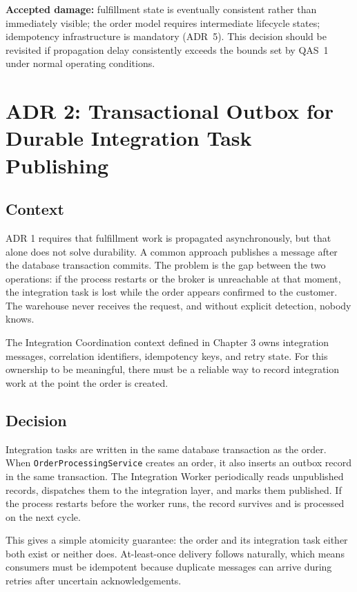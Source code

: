\textbf{Accepted damage:} fulfillment state is eventually consistent rather than immediately
visible; the order model requires intermediate lifecycle states; idempotency infrastructure
is mandatory (ADR~5). This decision should be revisited if propagation delay consistently
exceeds the bounds set by QAS~1 under normal operating conditions.

\section{ADR 2: Transactional Outbox for Durable Integration Task Publishing}

\subsection{Context}

ADR 1 requires that fulfillment work is propagated asynchronously, but that alone does not
solve durability. A common approach publishes a message after the database transaction commits.
The problem is the gap between the two operations: if the process restarts or the broker is
unreachable at that moment, the integration task is lost while the order appears confirmed to
the customer. The warehouse never receives the request, and without explicit detection, nobody
knows.

The Integration Coordination context defined in Chapter 3 owns integration messages,
correlation identifiers, idempotency keys, and retry state. For this ownership to be
meaningful, there must be a reliable way to record integration work at the point the order is
created.

\subsection{Decision}

Integration tasks are written in the same database transaction as the order. When
\texttt{OrderProcessingService} creates an order, it also inserts an outbox record in the same
transaction. The Integration Worker periodically reads unpublished records, dispatches them to
the integration layer, and marks them published. If the process restarts before the worker
runs, the record survives and is processed on the next cycle.

This gives a simple atomicity guarantee: the order and its integration task either both exist
or neither does. At-least-once delivery follows naturally, which means consumers must be
idempotent because duplicate messages can arrive during retries after uncertain acknowledgements.

